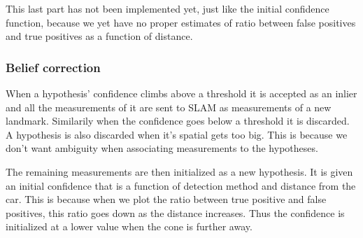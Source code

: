 This last part has not been implemented yet, just like the initial confidence function, because we yet have no proper estimates of ratio between false positives and true positives as a function of distance. 

\subsubsection{Belief correction}

When a hypothesis' confidence climbs above a threshold it is accepted as an inlier and all the measurements of it are sent to SLAM as measurements of a new landmark. Similarily when the confidence goes below a threshold it is discarded. A hypothesis is also discarded when it's spatial gets too big. This is because we don't want ambiguity when associating measurements to the hypotheses. 

The remaining measurements are then initialized as a new hypothesis. It is given an initial confidence that is a function of detection method and distance from the car. This is because when we plot the ratio between true positive and false positives, this ratio goes down as the distance increases. Thus the confidence is initialized at a lower value when the cone is further away. 

